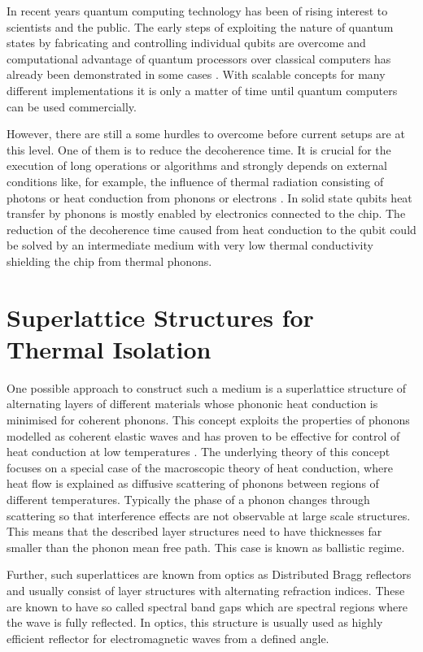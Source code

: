 In recent years quantum computing technology has been of rising
interest to scientists and the public. The early steps of exploiting the nature
of quantum states by fabricating and controlling individual qubits  are
overcome \cite{Leonard2019,Crippa2019} and computational advantage of quantum
processors
over
classical computers has already been demonstrated in some cases
\cite{Arute2019}. With scalable concepts for many
different implementations \cite{Cirac2000, Brecht2016, Bluhm2019, Lao2018}
it is only a matter of time until quantum computers can be used
commercially.

However, there are still a some hurdles to overcome before current setups are
at this level. One of them is to reduce the decoherence time. It is crucial for
the execution of long operations or algorithms and strongly
depends on external conditions like, for example, the influence of thermal
radiation consisting of photons or heat conduction from phonons or
electrons \cite{Ferraro2019}.
In solid state qubits heat transfer by phonons is mostly
enabled by electronics connected to the chip.
The reduction of the decoherence time caused from heat conduction to the qubit
could be solved by an intermediate medium with very low thermal
conductivity shielding the chip from thermal phonons.

\section{Superlattice Structures for Thermal Isolation}
One possible approach to
construct such a medium is a superlattice structure of alternating layers of
different materials whose phononic heat conduction is minimised for coherent
phonons. This concept exploits
the properties of phonons modelled as coherent elastic waves and has
proven to be effective for control of heat conduction at low temperatures
\cite{Luckyanova2012}. The underlying theory of this concept focuses on a
special case of the macroscopic theory of heat conduction, where heat flow is
explained as diffusive scattering of phonons between regions of different
temperatures.
Typically the phase of a phonon changes through scattering so that interference
effects are not observable at large scale structures. This means that the
described layer structures need to have thicknesses far smaller than
the phonon mean free path. This case is known as ballistic regime.

Further, such superlattices are known from optics as Distributed Bragg
reflectors and usually consist of layer structures with alternating refraction
indices. These are known to have so called spectral band gaps which are
spectral regions where the wave is fully reflected.
In optics, this structure is usually used as highly efficient reflector for
electromagnetic waves from a defined angle.

